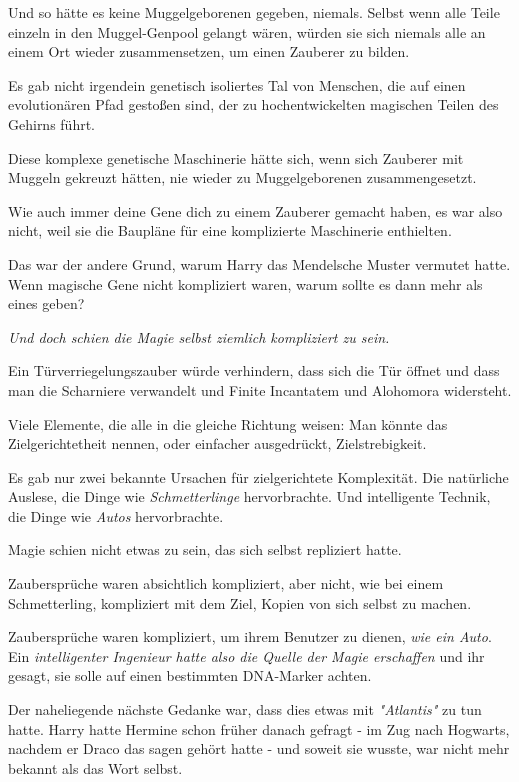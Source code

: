 {Und so hätte es keine Muggelgeborenen gegeben, niemals. Selbst wenn alle Teile einzeln in den Muggel-Genpool gelangt wären, würden sie sich niemals alle an einem Ort wieder zusammensetzen, um einen Zauberer zu bilden.

Es gab nicht irgendein genetisch isoliertes Tal von Menschen, die auf einen evolutionären Pfad gestoßen sind, der zu hochentwickelten magischen Teilen des Gehirns führt.

Diese komplexe genetische Maschinerie hätte sich, wenn sich Zauberer mit Muggeln gekreuzt hätten, nie wieder zu Muggelgeborenen zusammengesetzt.

Wie auch immer deine Gene dich zu einem Zauberer gemacht haben, es war also nicht, weil sie die Baupläne für eine komplizierte Maschinerie enthielten.

Das war der andere Grund, warum Harry das Mendelsche Muster vermutet hatte. Wenn magische Gene nicht kompliziert waren, warum sollte es dann mehr als eines geben?

\emph{Und doch schien die Magie selbst ziemlich kompliziert zu sein.}

Ein Türverriegelungszauber würde verhindern, dass sich die Tür öffnet und dass man die Scharniere verwandelt und Finite Incantatem und Alohomora widersteht.

Viele Elemente, die alle in die gleiche Richtung weisen: Man könnte das Zielgerichtetheit nennen, oder einfacher ausgedrückt, Zielstrebigkeit.

Es gab nur zwei bekannte Ursachen für zielgerichtete Komplexität. Die natürliche Auslese, die Dinge wie \emph{Schmetterlinge} hervorbrachte. Und intelligente Technik, die Dinge wie \emph{Autos} hervorbrachte.

Magie schien nicht etwas zu sein, das sich selbst repliziert hatte.

Zaubersprüche waren absichtlich kompliziert, aber nicht, wie bei einem Schmetterling, kompliziert mit dem Ziel, Kopien von sich selbst zu machen.

Zaubersprüche waren kompliziert, um ihrem Benutzer zu dienen, \emph{wie ein Auto}. Ein \emph{intelligenter Ingenieur hatte also die Quelle der Magie erschaffen} und ihr gesagt, sie solle auf einen bestimmten DNA-Marker achten.

Der naheliegende nächste Gedanke war, dass dies etwas mit \emph{"Atlantis"} zu tun hatte. Harry hatte Hermine schon früher danach gefragt - im Zug nach Hogwarts, nachdem er Draco das sagen gehört hatte - und soweit sie wusste, war nicht mehr bekannt als das Wort selbst.

}
